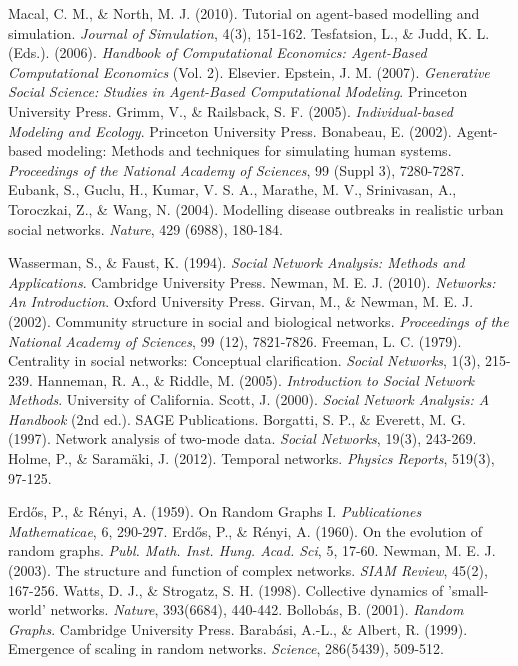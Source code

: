  Macal, C. M., \& North, M. J. (2010). Tutorial on agent-based modelling and simulation. \textit{Journal of Simulation}, 4(3), 151-162.
 Tesfatsion, L., \& Judd, K. L. (Eds.). (2006). \textit{Handbook of Computational Economics: Agent-Based Computational Economics} (Vol. 2). Elsevier.
 Epstein, J. M. (2007). \textit{Generative Social Science: Studies in Agent-Based Computational Modeling}. Princeton University Press.
 Grimm, V., \& Railsback, S. F. (2005). \textit{Individual-based Modeling and Ecology}. Princeton University Press.
 Bonabeau, E. (2002). Agent-based modeling: Methods and techniques for simulating human systems. \textit{Proceedings of the National Academy of Sciences}, 99 (Suppl 3), 7280-7287.
 Eubank, S., Guclu, H., Kumar, V. S. A., Marathe, M. V., Srinivasan, A., Toroczkai, Z., \& Wang, N. (2004). Modelling disease outbreaks in realistic urban social networks. \textit{Nature}, 429 (6988), 180-184.

 Wasserman, S., \& Faust, K. (1994). \textit{Social Network Analysis: Methods and Applications}. Cambridge University Press.
 Newman, M. E. J. (2010). \textit{Networks: An Introduction}. Oxford University Press.
 Girvan, M., \& Newman, M. E. J. (2002). Community structure in social and biological networks. \textit{Proceedings of the National Academy of Sciences}, 99 (12), 7821-7826.
 Freeman, L. C. (1979). Centrality in social networks: Conceptual clarification. \textit{Social Networks}, 1(3), 215-239.
 Hanneman, R. A., \& Riddle, M. (2005). \textit{Introduction to Social Network Methods}. University of California.
 Scott, J. (2000). \textit{Social Network Analysis: A Handbook} (2nd ed.). SAGE Publications.
 Borgatti, S. P., \& Everett, M. G. (1997). Network analysis of two-mode data. \textit{Social Networks}, 19(3), 243-269.
 Holme, P., \& Saramäki, J. (2012). Temporal networks. \textit{Physics Reports}, 519(3), 97-125.

 Erdős, P., \& Rényi, A. (1959). On Random Graphs I. \textit{Publicationes Mathematicae}, 6, 290-297.
 Erdős, P., \& Rényi, A. (1960). On the evolution of random graphs. \textit{Publ. Math. Inst. Hung. Acad. Sci}, 5, 17-60.
 Newman, M. E. J. (2003). The structure and function of complex networks. \textit{SIAM Review}, 45(2), 167-256.
 Watts, D. J., \& Strogatz, S. H. (1998). Collective dynamics of 'small-world' networks. \textit{Nature}, 393(6684), 440-442.
 Bollobás, B. (2001). \textit{Random Graphs}. Cambridge University Press.
 Barabási, A.-L., \& Albert, R. (1999). Emergence of scaling in random networks. \textit{Science}, 286(5439), 509-512.

